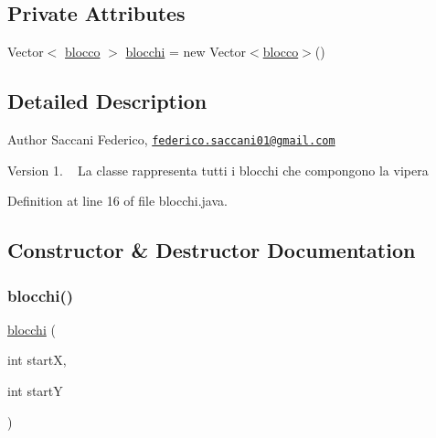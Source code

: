 \subsection*{Private Attributes}
\begin{DoxyCompactItemize}
\item 
Vector$<$ \mbox{\hyperlink{class_snake_1_1game_1_1vipera_1_1blocco}{blocco}} $>$ \mbox{\hyperlink{class_snake_1_1game_1_1vipera_1_1blocchi_ad6cdae3853215d2776147ba0c54ad406}{blocchi}} = new Vector$<$\mbox{\hyperlink{class_snake_1_1game_1_1vipera_1_1blocco}{blocco}}$>$()
\end{DoxyCompactItemize}


\subsection{Detailed Description}
\begin{DoxyAuthor}{Author}
Saccani Federico, \href{mailto:federico.saccani01@gmail.com}{\tt federico.\+saccani01@gmail.\+com} 
\end{DoxyAuthor}
\begin{DoxyVersion}{Version}
1. ~\newline
La classe rappresenta tutti i blocchi che compongono la vipera 
\end{DoxyVersion}


Definition at line 16 of file blocchi.\+java.



\subsection{Constructor \& Destructor Documentation}
\mbox{\label{class_snake_1_1game_1_1vipera_1_1blocchi_af15f919c8bd034fb2f61735594958357}} 
\subsubsection{\texorpdfstring{blocchi()}{blocchi()}}
{\footnotesize\ttfamily \mbox{\hyperlink{class_snake_1_1game_1_1vipera_1_1blocchi}{blocchi}} (\begin{DoxyParamCaption}\item[{int}]{startX,  }\item[{int}]{startY }\end{DoxyParamCaption})}



